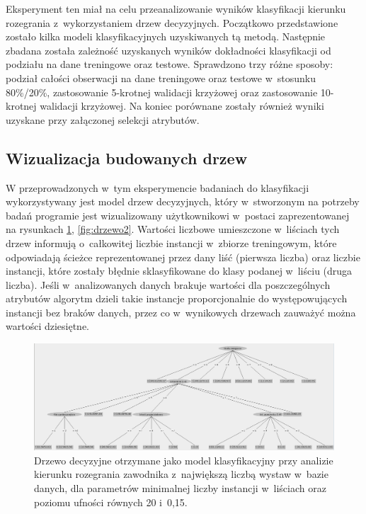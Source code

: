 \documentclass[a4paper,twoside,12pt]{book}
\begin{document}
Eksperyment ten miał na celu przeanalizowanie wyników klasyfikacji kierunku rozegrania z~wykorzystaniem drzew decyzyjnych. Początkowo przedstawione zostało kilka modeli klasyfikacyjnych uzyskiwanych tą metodą. Następnie zbadana została zależność uzyskanych wyników dokładności klasyfikacji od podziału na dane treningowe oraz testowe. Sprawdzono trzy różne sposoby: podział całości obserwacji na dane treningowe oraz testowe w~stosunku 80\%/20\%, zastosowanie 5-krotnej walidacji krzyżowej oraz zastosowanie 10-krotnej walidacji krzyżowej. Na koniec porównane zostały również wyniki uzyskane przy załączonej selekcji atrybutów.

\subsection{Wizualizacja budowanych drzew}
\label{roz:wizDrzewa}
W przeprowadzonych w~tym eksperymencie badaniach do klasyfikacji wykorzystywany jest model drzew decyzyjnych, który w~stworzonym na potrzeby badań programie jest wizualizowany użytkownikowi w~postaci zaprezentowanej na rysunkach \ref{fig:drzewo1}, \ref{fig:drzewo2}. Wartości liczbowe umieszczone w~liściach tych drzew informują o~całkowitej liczbie instancji w~zbiorze treningowym, które odpowiadają ścieżce reprezentowanej przez dany liść (pierwsza liczba) oraz liczbie instancji, które zostały błędnie sklasyfikowane do klasy podanej w~liściu (druga liczba). Jeśli w~analizowanych danych brakuje wartości dla poszczególnych atrybutów algorytm dzieli takie instancje proporcjonalnie do występowujących instancji bez braków danych, przez co w~wynikowych drzewach zauważyć można wartości dziesiętne.

\begin{figure}
\centering
\includegraphics[width=\columnwidth]{drzewoMM2085}
\caption{Drzewo decyzyjne otrzymane jako model klasyfikacyjny przy analizie kierunku rozegrania zawodnika z~największą liczbą wystaw w~bazie danych, dla parametrów minimalnej liczby instancji w~liściach oraz poziomu ufności równych 20 i~0,15.}
\label{fig:drzewo1}
\end{figure}
\end{document}

